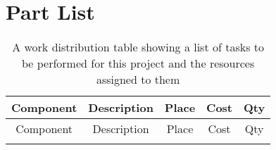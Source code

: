\section{Part List}

\begin{center}

    \begin{longtable}{|c|c|c|c|c|}
    \caption{A work distribution table showing a list of tasks to be performed for this project and the resources assigned to them  \label{tab:partList}} \\
     \hline
    
    Component & Description & Place & Cost  & Qty \\
    \hline \hline \endfirsthead
    
         \hline
    
    Component & Description & Place & Cost  & Qty \\
    \hline \hline \endhead
    
    \endfoot


\end{longtable}
\end{center}
